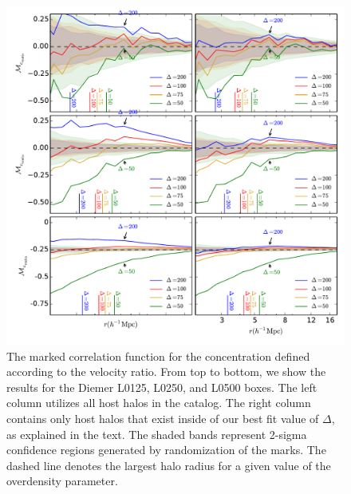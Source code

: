 \documentclass[usenatbib,usegraphicx,letterpaper]{mn2e}
\begin{document}
\begin{figure}
	\centering
	\includegraphics[width=\textwidth]{all_mcf_cvratio_z00_hostsvmatch.pdf}
	\caption{The marked correlation function for the concentration defined according to the velocity ratio. From top to bottom, we show the results for the Diemer L0125, L0250, and L0500 boxes. The left column utilizes all host halos in the catalog. The right column contains only host halos that exist inside of our best fit value of $\Delta$, as explained in the text. The shaded bands represent 2-sigma confidence regions generated by randomization of the marks. The dashed line denotes the largest halo radius for a given value of the overdensity parameter. }
\end{figure}
\end{document}
